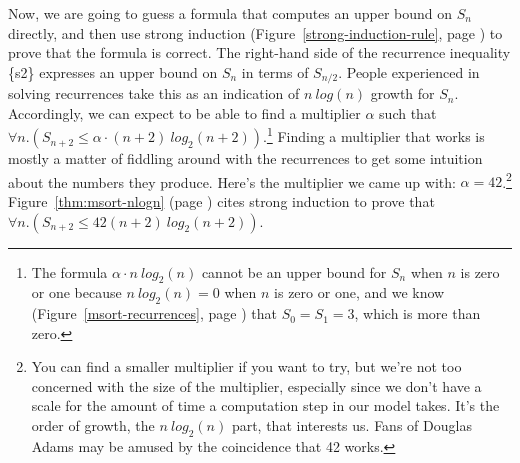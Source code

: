 Now, we are going to guess a formula that computes an upper bound on $S_n$ directly,
and then use strong induction
(Figure~\ref{strong-induction-rule}, page \pageref{strong-induction-rule})
to prove that the formula is correct.
The right-hand side of the recurrence inequality \{s2\} expresses
an upper bound on $S_n$ in terms of $S_{n/2}$.
People experienced in solving recurrences take this as an
indication of $n~log(n)$ growth for $S_n$.
Accordingly, we can expect to be able to find a multiplier $\alpha$ such that
$\forall n.(S_{n+2} \leq \alpha \cdot (n+2)~log_2(n+2))$.\footnote{The
formula $\alpha\cdot n~log_2(n)$ cannot be an upper bound for $S_n$
when $n$ is zero or one because $n~log_2(n) = 0$ when $n$ is zero or one,
and we know
(Figure~\ref{msort-recurrences}, page \pageref{msort-recurrences})
that $S_0 = S_1 = 3$, which is more than zero.}
Finding a multiplier that works is mostly a matter of
fiddling around with the recurrences to get some intuition
about the numbers they produce.
Here's the multiplier we came up with: $\alpha = 42$.\footnote{You
can find a smaller multiplier if you want to try, but
we're not too concerned with the size of the multiplier,
especially since we don't have a scale for the amount of time
a computation step in our model takes.
It's the order of growth, the $n~log_2(n)$ part, that interests us.
Fans of Douglas Adams may be amused by the coincidence that 42 works.}
Figure~\ref{thm:msort-nlogn} (page \pageref{thm:msort-nlogn})
cites strong induction to prove that
$\forall n.(S_{n+2} \leq 42(n+2)~log_2(n+2))$.


